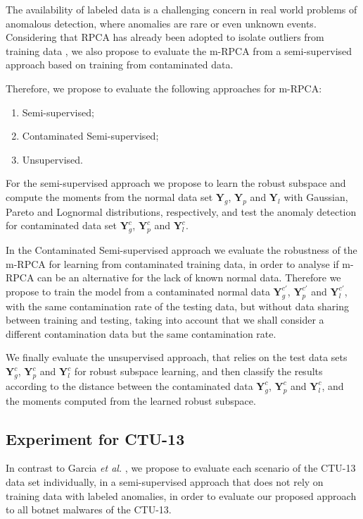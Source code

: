 The availability of labeled data is a challenging concern in real world problems of anomalous detection, where anomalies are rare or even unknown events. Considering that RPCA has already been adopted to isolate outliers from training data \cite{zhou2017anomaly}, we also propose to evaluate the m-RPCA from a semi-supervised approach based on training from contaminated data.

Therefore, we propose to evaluate the following approaches for m-RPCA:
\begin{enumerate}
	\item Semi-supervised;
	\item Contaminated Semi-supervised;
	\item Unsupervised.
\end{enumerate}

For the semi-supervised approach we propose to learn the robust subspace and compute the moments from the normal data set $\boldsymbol{Y}_g$, $\boldsymbol{Y}_p$ and $\boldsymbol{Y}_l$ with Gaussian, Pareto and Lognormal distributions, respectively, and test the anomaly detection for contaminated data set $\boldsymbol{Y}_g^c$, $\boldsymbol{Y}_p^c$ and $\boldsymbol{Y}_l^c$. 

In the Contaminated Semi-supervised approach we evaluate the robustness of the m-RPCA for learning from contaminated training data, in order to analyse if m-RPCA can be an alternative for the lack of known normal data. Therefore we propose to train the model from a contaminated normal data $\boldsymbol{Y}_g^{c'}$, $\boldsymbol{Y}_p^{c'}$ and $\boldsymbol{Y}_l^{c'}$, with the same contamination rate of the testing data, but without data sharing between training and testing, taking into account that we shall consider a different contamination data but the same contamination rate.

We finally evaluate the unsupervised approach, that relies on the test data sets $\boldsymbol{Y}_g^c$, $\boldsymbol{Y}_p^c$ and $\boldsymbol{Y}_l^c$ for robust subspace learning, and then classify the results according to the distance between the contaminated data $\boldsymbol{Y}_g^c$, $\boldsymbol{Y}_p^c$ and $\boldsymbol{Y}_l^c$, and the moments computed from the learned robust subspace.

\subsection{Experiment for CTU-13}
\label{sec:4_CTU13Scenario}

In contrast to Garcia \emph{et al.} \cite{garcia2014empirical}, we propose to evaluate each scenario of the CTU-13 data set individually, in a semi-supervised approach that does not rely on training data with labeled anomalies, in order to evaluate our proposed approach to all botnet malwares of the CTU-13. 

